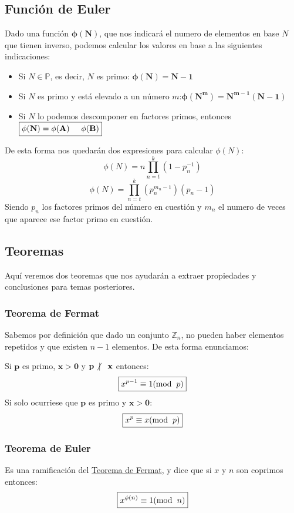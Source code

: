 \subsection{Función de Euler}
\noindent Dado una función \(\mathbf{\phi (N)}\), que nos indicará el numero de elementos en base \(N\) que tienen inverso, podemos calcular los valores en base a las siguientes indicaciones:
\begin{itemize}
        \item Si \(N \in \mathbb{P}\), es decir, \(N\) es primo: \(\boxed{\mathbf{\phi (N) = N - 1}}\)
        \item Si \(N\) es primo y está elevado a un número \(m\):\(\boxed{\mathbf{\phi (N^m) = N^{m-1}(N-1)}}\)
        \item Si \(N\) lo podemos descomponer en factores primos, entonces \(\boxed{\mathbf{\phi (N) = \phi(A)\hspace{5mm} \phi(B)}}\)
\end{itemize}
\noindent De esta forma nos quedarán dos expresiones para calcular \(\phi(N)\):
\[
        \phi(N) = n \prod^k_{n=t}(1-p_n^{-1})
\]
\[
        \boxed{\phi(N)   = \prod^k_{n=t}(p_n^{m_n-1})(p_n-1)}
\]
\noindent Siendo \(p_n\) los factores primos del número en cuestión y \(m_n\) el numero de veces que aparece ese factor primo en cuestión.
\subsection{Teoremas}
\noindent Aquí veremos dos teoremas que nos ayudarán a extraer propiedades y conclusiones para temas posteriores.
\subsubsection{Teorema de Fermat}
\noindent Sabemos por definición que dado un conjunto \(\mathbb{Z}_n\), no pueden haber elementos repetidos y que existen \(n-1\) elementos. De esta forma enunciamos:
\par \noindent Si \(\mathbf{p}\) es primo, \(\mathbf{x>0}\) y \(\mathbf{p\not |\hspace{3mm}x }\) entonces:
\[
        \boxed{x^{p-1} \equiv 1(\textnormal{mod}\hspace{2mm}p)}
\]
\noindent Si solo ocurriese que \(\mathbf{p}\) es primo y \(\mathbf{x>0}\):
\[
        \boxed{x^{p} \equiv x(\textnormal{mod}\hspace{2mm}p)}
\]
\subsubsection{Teorema de Euler}
\noindent Es una ramificación del \underline{Teorema de Fermat}, y dice que si \(x\) y \(n\) son coprimos entonces:
\[
        \boxed{x^{\phi(n)} \equiv 1(\textnormal{mod}\hspace{2mm}n)}
\]
